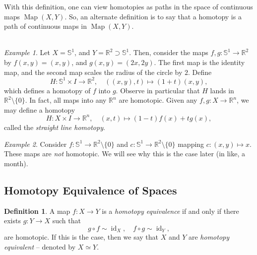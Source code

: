 \documentclass[a4paper]{report}
\theoremstyle{definition}
\newtheorem{definition}{Definition}
\theoremstyle{remark}
\theoremstyle{proposition}
\theoremstyle{conjecture}
\theoremstyle{lemma}
\theoremstyle{corollary}
\theoremstyle{exercise}
\newtheorem{example}{Example}
\newcommand{\on}{\operatorname}
\begin{document}
With this definition, one can view homotopies as paths in the space of 
continuous maps $\on{Map}(X,Y)$. So, an alternate definition is to say that a 
homotopy is a path of continuous maps in $\on{Map}(X,Y)$.\\\\

\begin{example}
    Let $X = \mathbb{S}^1$, and $Y = \mathbb{R}^2 \supset \mathbb{S}^1$.
    Then, consider the maps $f,g : \mathbb{S}^1 \to \mathbb{R}^2$ by
    $f(x,y) = (x,y)$, and $g(x,y) = (2x,2y)$. 
    The first map is the identity map, and the second map scales 
    the radius of the circle by $2$.
    Define $$H : \mathbb{S}^1 \times I \longrightarrow \mathbb{R}^2,\quad ( (x,y),t) \longmapsto (1+t)(x,y),$$
    which defines a homotopy of $f$ into $g$.
    Observe in particular that $H$ lands in 
    $\mathbb{R}^2\setminus \lbrace 0\rbrace$.
    In fact, all maps into any $\mathbb{R}^n$ are homotopic. 
    Given any $f,g :  X \to \mathbb{R}^n$, we may define a homotopy 
    $$H : X \times I \longrightarrow \mathbb{R}^n,\quad (x,t) \longmapsto (1-t)f(x) + tg(x),$$
    called the \emph{straight line homotopy}.
\end{example}

\begin{example}
    Consider $f : \mathbb{S}^1 \to \mathbb{R}^2\setminus \lbrace0\rbrace$ and 
    $c : \mathbb{S}^1 \to \mathbb{R}^2\setminus \lbrace 0\rbrace$
    mapping $c : (x,y) \longmapsto x$. These maps are \emph{not} homotopic.
    We will see why this is the case later (in like, a month).
\end{example}

\subsection{Homotopy Equivalence of Spaces}

\begin{definition}
    A map $f : X \to Y$ is a \emph{homotopy equivalence} if and only if 
    there exists $g : Y \to X$ such that 
    $$g \circ f \sim \on{id}_X,\quad f \circ g \sim \on{id}_Y,$$
    are homotopic. If this is the case, then we say that $X$ and $Y$ 
    are \emph{homotopy equivalent} -- denoted by $X \simeq Y$.
\end{definition}
\end{document}
